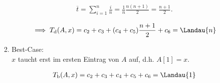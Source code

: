 \begin{solution}
\begin{enumerate}[label = (\alph*)]
\begin{enumerate}[label = \arabic*.]
    \begin{align*}
      \overline{t}
      =
      \sum_{i=1}^n \frac{i}{n}
      =
      \frac{1}{n} \frac{n (n + 1)}{2}
      =
      \frac{n + 1}{2}.
    \end{align*}

    \begin{align*}
      \implies
      T_{\mathrm{d}}(A, x)
      =
      c_2 + c_3 + (c_4 + c_5) \frac{n + 1}{2} + c_6
      =
      \Landau{n}
    \end{align*}  

    \item Best-Case: \\
    $x$ taucht erst im ersten Eintrag von $A$ auf, d.h. $A[1] = x$.

    \begin{align*}
      T_{\mathrm{b}}(A, x)
      =
      c_2 + c_3 + c_4 + c_5 + c_6
      =
      \Landau{1}
    \end{align*}
  
  \end{enumerate}

\end{enumerate}

\end{solution}


